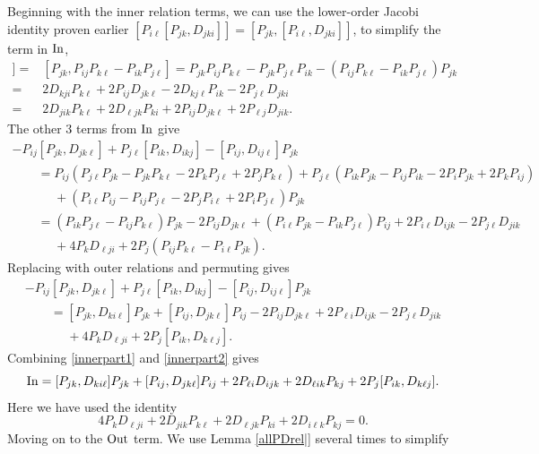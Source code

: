 \documentclass[10pt,a4paper]{amsart}
\numberwithin{equation}{section}
\begin{document}
Beginning with the inner relation terms, we can use the lower-order Jacobi identity proven earlier
$ [P_{i \ell}[P_{jk}, D_{jki}]] =[P_{jk}, [P_{i\ell}, D_{jki}]]$,
to simplify the term in ${\rm In}$,
 \begin{align}
  [P_{i \ell}[P_{jk}, D_{jki}]] ={}& [P_{jk}, P_{ij}P_{k\ell}-P_{ik}P_{j\ell}]
   = P_{jk}P_{ij}P_{k\ell}- P_{jk}P_{j\ell}P_{ik} -(P_{ij}P_{k\ell}-P_{ik}P_{j\ell})P_{jk} \nonumber \\
   ={}&2D_{kji}P_{k\ell}+2P_{ij}D_{jk\ell}- 2D_{kj\ell}P_{ik}-2P_{j\ell}D_{jki}
   \nonumber \\
   ={}& 2D_{jik}P_{k\ell} +2 D_{\ell jk}P_{ki} +2P_{ij}D_{jk\ell}+2P_{\ell j}D_{jik}.\label{innerpart1}
 \end{align}
 The other 3 terms from ${\rm In}$ give
 \begin{gather*}
   - P_{ij}[P_{jk}, D_{jk\ell}] + P_{j\ell} [P_{ik}, D_{ikj}]-[P_{ij}, D_{ij\ell}] P_{jk}\\
  \qquad  = P_{ij}( P_{j\ell}P_{jk}-P_{jk}P_{k\ell} - 2P_kP_{j\ell} +2P_j P_{k\ell}) +P_{j\ell}( P_{ik}P_{jk}-P_{ij}P_{ik}-2P_iP_{jk}+2P_kP_{ij})
\\
 \phantom{\qquad  =}{} + (P_{i\ell}P_{ij}-P_{ij}P_{j\ell} -2P_jP_{i\ell}+2P_iP_{j\ell})P_{jk}\\
   \qquad = (P_{ik}P_{j\ell} -P_{ij}P_{k\ell})P_{jk}-2P_{ij}D_{jk\ell}
     +(P_{i\ell}P_{jk}- P_{ik}P_{j\ell})P_{ij} +2P_{i\ell}D_{ijk}- 2P_{j\ell}D_{jik}\\
    \phantom{\qquad  =}{}   +4P_{k}D_{\ell j i}+2P_j(P_{ij}P_{k\ell} - P_{i\ell}P_{jk}).
 \end{gather*}
 Replacing with outer relations and permuting gives
 \begin{gather}
   - P_{ij}[P_{jk}, D_{jk\ell}]+P_{j\ell} [P_{ik}, D_{ikj}]-[P_{ij}, D_{ij\ell}] P_{jk} \nonumber \\
   \qquad=[P_{jk}, D_{ki\ell}]P_{jk}+[P_{ij}, D_{jk\ell}]P_{ij}
    -2P_{ij}D_{jk\ell} +2P_{\ell i }D_{ijk}- 2P_{j\ell}D_{jik}\nonumber\\
  \phantom{\qquad  =}{} +4P_{k}D_{\ell j i}+2P_j[P_{ik}, D_{k\ell j}].\label{innerpart2}
   \end{gather}
   Combining \eqref{innerpart1} and \eqref{innerpart2} gives
   \[
    {\rm In} = [P_{jk}, D_{ki\ell}]P_{jk}+[P_{ij}, D_{jk\ell}]P_{ij}+2P_{\ell i }D_{ijk}+2D_{\ell i k}P_{kj}+2P_j[P_{ik}, D_{k\ell j}].
    \]
   Here we have used the identity
   \[ 4P_{k}D_{\ell j i} + 2D_{jik}P_{k\ell} +2 D_{\ell jk}P_{ki}+2D_{i\ell k}P_{kj}=0.\]
Moving on to the ${\rm Out}$ term. We use Lemma \ref{allPDrel|} several times to simplify
\end{document}
